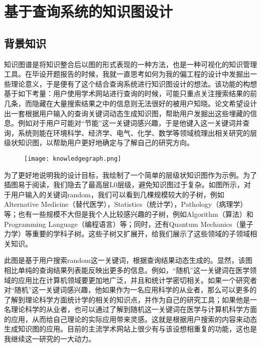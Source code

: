 
\chapter{基于查询系统的知识图设计}
\label{chap:c6}
\section{背景知识}
知识图谱是将知识整合后以图的形式表现的一种方法，也是一种可视化的知识管理工具。在毕设开题报告的时候，我就一直思考如何为我的偏工程的设计中发掘出一些理论意义，于是便有了这个结合查询系统进行知识图设计的想法。该功能的构想基于如下考量：用户使用学术网站进行查询的时候，可能只重点关注搜索结果的前几条，而隐藏在大量搜索结果之中的信息则无法很好的被用户知晓。论文希望设计出一套根据用户输入的查询关键词动态生成知识图，帮助用户发掘出这些埋藏的信息。例如对于用户可能对“节能”这一关键词感兴趣，于是他键入这一关键词并查询，系统则能在环境科学、经济学、电气、化学、数学等领域梳理出相关研究的层级状知识图，以帮助用户更好地确定与了解自己的研究方向。

\begin{figure}[!htp]
  \centering
  \texttt{[image: knowledgegraph.png]}
\end{figure}

为了更好地说明我的设计目标，我绘制了一个简单的层级状知识图作为示例。为了插图易于阅读，我们隐去了最高层L0层级，避免知识图过于复杂。如图所示，对于用户输入的关键词random，我们可以看到几棵规模较大的子树，例如Alternative Medicine（替代医学），Statistics（统计学），Pathology（病理学）等；也有一些规模不大但是我个人比较感兴趣的子树，例如Algorithm（算法）和Programming Language（编程语言）等；同时，还有Quantum Mechanics（量子力学）等重要的学科子树。这些子树又扩展开，给我们展示了这些领域的子领域相关知识。

此图是基于用户搜索random这一关键词，根据查询结果动态生成的。显然，该图相比单纯的查询结果列表能反映出更多的信息。例如，“随机”这一关键词在医学领域的应用比在计算机领域要更加地广泛，并且和统计学密切相关。如果一个研究者对“随机”这一关键词感兴趣，他如果作为一名应用科学的从业者，那么可以更多的了解到理论科学方面统计学的相关的知识点，并作为自己的研究工具；如果他是一名理论科学的从业者，也可以通过了解到随机这一关键词在医学与计算机科学方面的应用，从而给自己理论的实际应用带来灵感。这就是根据用户搜索的内容来动态生成知识图的应用。目前的主流学术网站上很少有与该设想相重复的功能，这也是我继续这一研究的一大动力。

